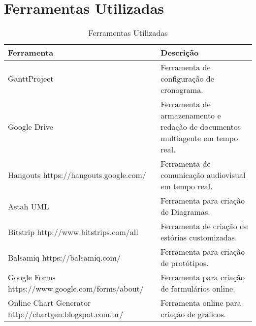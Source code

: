 \chapter[Ferramentas Utilizadas]{Ferramentas Utilizadas}

\begin{table}[H]
	\begin{tabular}{| p{8cm} | p{8cm} |}
		\hline 
		\textbf{Ferramenta} & \textbf{Descrição}\tabularnewline
		\hline 
		\hline 
		GanttProject & Ferramenta de configuração de cronograma. \tabularnewline
		\hline 
		Google Drive & Ferramenta de armazenamento e redação de documentos multiagente em
		tempo real. \tabularnewline
		\hline 
		Hangouts https://hangouts.google.com/ & Ferramenta de comunicação audiovisual em tempo real. \tabularnewline
		\hline 
		Astah UML & Ferramenta para criação de Diagramas. \tabularnewline
		\hline 
		Bitstrip http://www.bitstrips.com/all & Ferramenta de criação de estórias customizadas. \tabularnewline
		\hline 
		Balsamiq https://balsamiq.com/ & Ferramenta para criação de protótipos. \tabularnewline
		\hline 
		Google Forms https://www.google.com/forms/about/ & Ferramenta para criação de formulários online. \tabularnewline
		\hline 
		Online Chart Generator http://chartgen.blogspot.com.br/ & Ferramenta online para criação de gráficos. \tabularnewline
		\hline 
	\end{tabular}
	\caption{Ferramentas Utilizadas}
	\label{Ferramentas_Utilizadas}
\end{table}